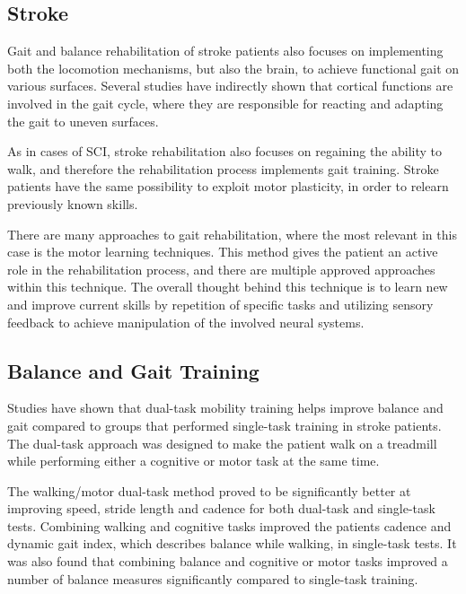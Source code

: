 \subsection{Stroke}

Gait and balance rehabilitation of stroke patients also focuses on implementing both the locomotion mechanisms, but also the brain, to achieve functional gait on various surfaces. Several studies have indirectly shown that cortical functions are involved in the gait cycle, where they are responsible for reacting and adapting the gait to uneven surfaces. \cite{Belda2011}

As in cases of SCI, stroke rehabilitation also focuses on regaining the ability to walk, and therefore the rehabilitation process implements gait training. Stroke patients have the same possibility to exploit motor plasticity, in order to relearn previously known skills. \cite{Belda2011}

There are many approaches to gait rehabilitation, where the most relevant in this case is the motor learning techniques. This method gives the patient an active role in the rehabilitation process, and there are multiple approved approaches within this technique. The overall thought behind this technique is to learn new and improve current skills by repetition of specific tasks and utilizing sensory feedback to achieve manipulation of the involved neural systems. \cite{Belda2011}

\subsection{Balance and Gait Training}

Studies have shown that dual-task mobility training helps improve balance and gait compared to groups that performed single-task training in stroke patients. The dual-task approach was designed to make the patient walk on a treadmill while performing either a cognitive or motor task at the same time. \cite{He2018}

The walking/motor dual-task method proved to be significantly better at improving speed, stride length and cadence for both dual-task and single-task tests. Combining walking and cognitive tasks improved the patients cadence and dynamic gait index, which describes balance while walking, in single-task tests. It was also found that combining balance and cognitive or motor tasks improved a number of balance measures significantly compared to single-task training. \cite{He2018}

